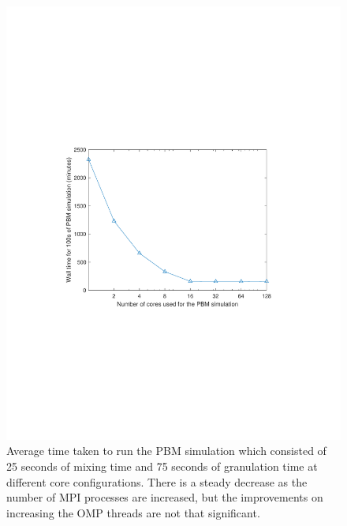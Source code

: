 \documentclass[preprint,11pt,authoryear]{elsarticle}
\begin{document}
\begin{figure}[H]
\centering
\includegraphics[scale=0.75]{rslsts_PBM_timing.pdf}
\caption{Average time taken to run the PBM simulation which consisted of 25 seconds of mixing time 
and 75 seconds of granulation time at different core configurations. There is a steady decrease as 
the number of MPI processes are increased, but the improvements on increasing the OMP threads are 
not that significant.}
\label{fig:rslts_PBM_timing_studies}
\end{figure}
\end{document}
